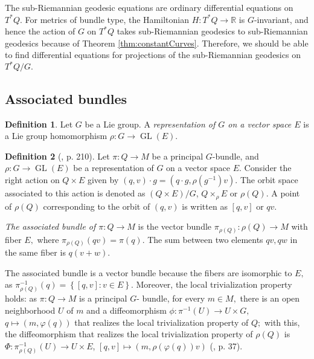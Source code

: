 \documentclass[12pt, letterpaper, reqno]{amsart}
\theoremstyle{definition}
\newtheorem{df}{Definition}
\theoremstyle{plain}
\theoremstyle{remark}
\begin{document}
The sub-Riemannian geodesic equations are ordinary differential equations on $ T^*Q. $ For metrics of bundle type, the Hamiltonian $ H: T^*Q \rightarrow  \mathbb{R} $ is $ G $-invariant, and hence the action of $ G $ on $ T^*Q $ takes sub-Riemannian geodesics to sub-Riemannian geodesics because of Theorem \ref{thm:constantCurves}. Therefore, we should be able to find differential equations for projections of the sub-Riemannian geodesics on $ T^*Q/G. $ 

 \subsection{Associated bundles}%
 \label{sub:associated_bundles}

\begin{df}
	Let $ G $ be a Lie group. A \textit{representation of $ G $ on a vector space $ E $} is a Lie group homomorphism $ \rho: G \rightarrow \operatorname{GL} (E). $ 
\end{df}

\begin{df}[\cite{montgomery2002tour}, p. 210]
	Let $ \pi: Q \rightarrow M $ be a principal $ G $-bundle, and $ \rho: G \rightarrow \operatorname{GL}(E) $ be a representation of $ G $ on a vector space $ E. $ Consider the right action on $ Q\times E $ given by $ (q,v)\cdot g = (q\cdot g, \rho(g^{-1})v). $  The orbit space associated to this action is denoted as $ (Q\times E)/G $, $ Q\times_\rho E $ or $ \rho(Q). $  A point of $ \rho(Q) $ corresponding to the orbit of $ (q,v) $ is written as $ [q,v] $ or $ qv. $  

	\textit{The associated bundle of $ \pi:Q \rightarrow M $ } is the vector bundle $ \pi_{ \rho(Q)}: \rho(Q) \rightarrow M $ with fiber $ E, $ where $ \pi_{\rho(Q)}(qv)=\pi(q). $ The sum between two elements $ qv,qw$ in the same fiber is $ q(v+w). $  
\end{df}

The associated bundle is a vector bundle because the fibers are isomorphic to $ E, $ as $ \pi_{\rho(Q)}^{-1}(q)= \left\{ [q,v]: v\in E \right\}.  $ Moreover, the local trivialization property holds: as $ \pi: Q \rightarrow M $ is a principal $ G $- bundle, for every $ m\in M, $ there is an open neighborhood $ U $ of $ m $ and a diffeomorphism $ \phi: \pi^{-1}(U) \rightarrow U \times G, $ $ q \mapsto (m, \varphi(q)) $ that realizes the local trivialization property of $ Q; $ with this, the diffeomorphism that realizes the local trivialization property of $ \rho(Q) $ is $ \Phi: \pi_{\rho(Q)}^{-1}(U) \rightarrow U\times E $, $ [q,v] \mapsto (m, \rho(\varphi(q))v) $ (\cite{sharpe2000differential}, p. 37).  
\end{document}
